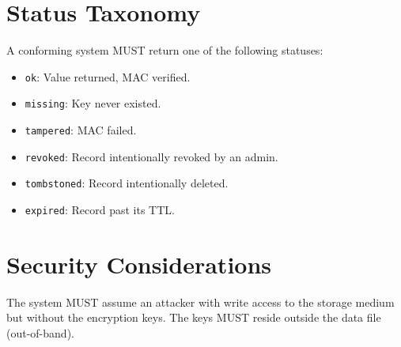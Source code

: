 \documentclass[11pt, a4paper]{article}
\begin{document}
\section{Status Taxonomy}
A conforming system MUST return one of the following statuses:
\begin{itemize}
    \item \texttt{ok}: Value returned, MAC verified.
    \item \texttt{missing}: Key never existed.
    \item \texttt{tampered}: MAC failed.
    \item \texttt{revoked}: Record intentionally revoked by an admin.
    \item \texttt{tombstoned}: Record intentionally deleted.
    \item \texttt{expired}: Record past its TTL.
\end{itemize}

\section{Security Considerations}
The system MUST assume an attacker with write access to the storage medium but without the encryption keys. The keys MUST reside outside the data file (out-of-band).
\end{document}
